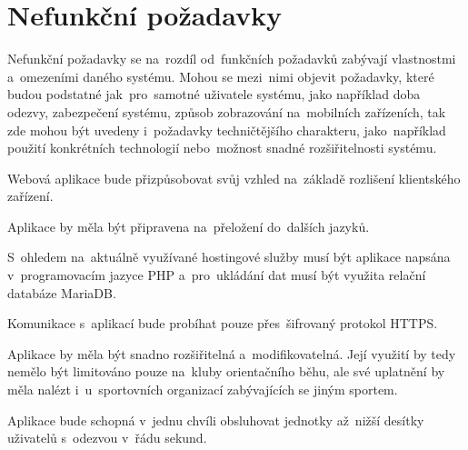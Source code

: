 \section{Nefunkční požadavky}
Nefunkční požadavky se na~rozdíl od~funkčních požadavků zabývají vlastnostmi a~omezeními daného systému. Mohou se mezi~nimi objevit požadavky, které budou podstatné jak~pro~samotné uživatele systému, jako například doba odezvy, zabezpečení systému, způsob zobrazování na~mobilních zařízeních, tak zde mohou být uvedeny i~požadavky techničtějšího charakteru, jako~například použití konkrétních technologií nebo~možnost snadné rozšiřitelnosti systému. \cite{requirements}

\begin{enumerate}[label=\textcolor{decoration}{\textbf{N\arabic*}}, leftmargin=7mm]
	Webová aplikace bude přizpůsobovat svůj vzhled na~základě rozlišení klientského zařízení.

	Aplikace by měla být připravena na~přeložení do~dalších jazyků.

	\label{n:technologies}
	S~ohledem na~aktuálně využívané hostingové služby musí být aplikace napsána v~programovacím jazyce PHP a~pro~ukládání dat musí být využita relační databáze MariaDB.

	Komunikace s~aplikací bude probíhat pouze přes~šifrovaný protokol HTTPS.

	Aplikace by měla být snadno rozšiřitelná a~modifikovatelná. Její využití by tedy nemělo být limitováno pouze na~kluby orientačního běhu, ale své uplatnění by měla nalézt i~u~sportovních organizací zabývajících se jiným sportem.

	Aplikace bude schopná v~jednu chvíli obsluhovat jednotky až~nižší desítky uživatelů s~odezvou v~řádu sekund.
\end{enumerate}
